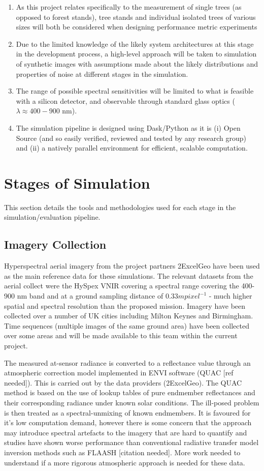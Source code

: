 \documentclass[10pt,a4paper,final,twocolumn]{article}
\begin{document}
\begin{enumerate}
\item As this project relates specifically to the measurement of single trees (as opposed to forest stands), tree stands and individual isolated trees of various sizes will both be considered when designing performance metric experiments
\item Due to the limited knowledge of the likely system architectures at this stage in the development process, a high-level approach will be taken to simulation of synthetic images with assumptions made about the likely distributions and properties of noise at different stages in the simulation.
\item The range of possible spectral sensitivities will be limited to what is feasible with a silicon detector, and observable through standard glass optics ($\lambda \approx 400 - 900$ nm).
\item The simulation pipeline is designed using Dask/Python as it is (i) Open Source (and so easily verified, reviewed and tested by any research group) and (ii) a natively parallel environment for efficient, scalable computation.
\end{enumerate}
 

\section{Stages of Simulation}
This section details the tools and methodologies used for each stage in the simulation/evaluation pipeline.
\subsection{Imagery Collection}
Hyperspectral aerial imagery from the project partners 2ExcelGeo have been used as the main reference data for these simulations. The relevant datasets from the aerial collect were the HySpex VNIR covering a spectral range covering the 400-900 nm band and at a ground sampling distance of $0.33 m pixel^{-1}$ - much higher spatial and spectral resolution than the proposed mission. Imagery have been collected over a number of UK cities including Milton Keynes and Birmingham. Time sequences (multiple images of the same ground area) have been collected over some areas and will be made available to this team within the current project.

The measured at-sensor radiance is converted to a reflectance value through an  atmospheric correction model implemented in ENVI software (QUAC [ref needed]). This is carried out by the data providers (2ExcelGeo). The QUAC method is based on the use of lookup tables of pure endmember reflectances and their corresponding radiance under known solar conditions. The ill-posed problem is then treated as a spectral-unmixing of known endmembers. It is favoured for it's low computation demand, however there is some concern that the approach may introduce spectral artefacts to the imagery that are hard to quantify and studies have shown worse performance than conventional radiative transfer model inversion methods such as FLAASH [citation needed]. More work needed to understand if a more rigorous atmospheric approach is needed for these data.
\end{document}
